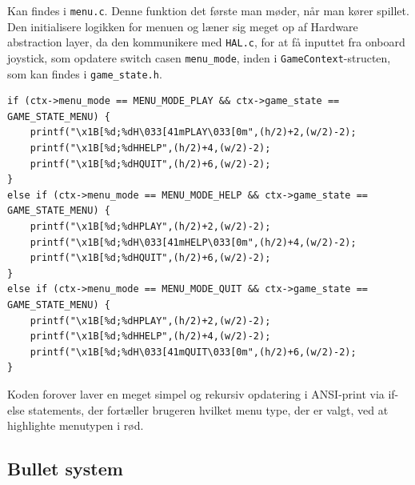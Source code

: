 Kan findes i \lstinline!menu.c!. Denne funktion det første man møder, når man kører spillet. Den initialisere logikken for menuen og læner sig meget op af Hardware abstraction layer, da den kommunikere med \lstinline!HAL.c!, for at få inputtet fra onboard joystick, som opdatere switch casen \lstinline!menu_mode!, inden i \lstinline!GameContext!-structen, som kan findes i \lstinline!game_state.h!.

\vspace{3em}
\begin{lstlisting}
if (ctx->menu_mode == MENU_MODE_PLAY && ctx->game_state == GAME_STATE_MENU) {
    printf("\x1B[%d;%dH\033[41mPLAY\033[0m",(h/2)+2,(w/2)-2); 
    printf("\x1B[%d;%dHHELP",(h/2)+4,(w/2)-2);
    printf("\x1B[%d;%dHQUIT",(h/2)+6,(w/2)-2);
}
else if (ctx->menu_mode == MENU_MODE_HELP && ctx->game_state == GAME_STATE_MENU) {
    printf("\x1B[%d;%dHPLAY",(h/2)+2,(w/2)-2);
    printf("\x1B[%d;%dH\033[41mHELP\033[0m",(h/2)+4,(w/2)-2);
    printf("\x1B[%d;%dHQUIT",(h/2)+6,(w/2)-2);
}
else if (ctx->menu_mode == MENU_MODE_QUIT && ctx->game_state == GAME_STATE_MENU) {
    printf("\x1B[%d;%dHPLAY",(h/2)+2,(w/2)-2);
    printf("\x1B[%d;%dHHELP",(h/2)+4,(w/2)-2);
    printf("\x1B[%d;%dH\033[41mQUIT\033[0m",(h/2)+6,(w/2)-2);
}
\end{lstlisting}
\vspace{-2em}

Koden forover laver en meget simpel og rekursiv opdatering i ANSI-print via if-else statements, der fortæller brugeren hvilket menu type, der er valgt, ved at highlighte menutypen i rød.

\vspace{3pt}
\subsection{Bullet system}
\vspace{3pt}

